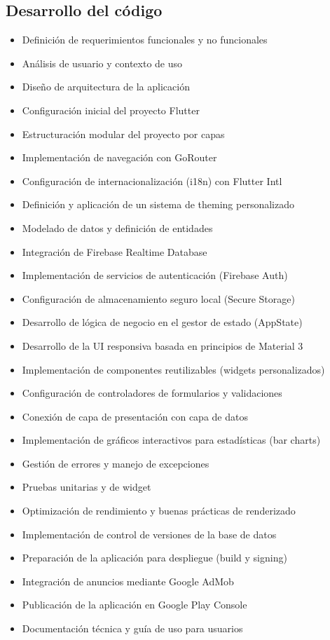 \subsection{Desarrollo del código}


\begin{itemize}
    \item Definición de requerimientos funcionales y no funcionales
    \item Análisis de usuario y contexto de uso
    \item Diseño de arquitectura de la aplicación
    \item Configuración inicial del proyecto Flutter
    \item Estructuración modular del proyecto por capas
    \item Implementación de navegación con GoRouter
    \item Configuración de internacionalización (i18n) con Flutter Intl
    \item Definición y aplicación de un sistema de theming personalizado
    \item Modelado de datos y definición de entidades
    \item Integración de Firebase Realtime Database
    \item Implementación de servicios de autenticación (Firebase Auth)
    \item Configuración de almacenamiento seguro local (Secure Storage)
    \item Desarrollo de lógica de negocio en el gestor de estado (AppState)
    \item Desarrollo de la UI responsiva basada en principios de Material 3
    \item Implementación de componentes reutilizables (widgets personalizados)
    \item Configuración de controladores de formularios y validaciones
    \item Conexión de capa de presentación con capa de datos
    \item Implementación de gráficos interactivos para estadísticas (bar charts)
    \item Gestión de errores y manejo de excepciones
    \item Pruebas unitarias y de widget
    \item Optimización de rendimiento y buenas prácticas de renderizado
    \item Implementación de control de versiones de la base de datos
    \item Preparación de la aplicación para despliegue (build y signing)
    \item Integración de anuncios mediante Google AdMob
    \item Publicación de la aplicación en Google Play Console
    \item Documentación técnica y guía de uso para usuarios
\end{itemize}






